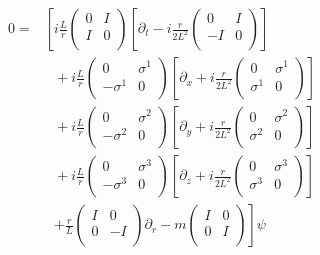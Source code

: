 \begin{align}
   0 =& \left[ i\frac{L}{r} \begin{pmatrix} 0 & I \\ I & 0 \\ \end{pmatrix} \left[ \partial_t - i\frac{r}{2L^2}\begin{pmatrix} 0 & I \\ -I & 0 \\ \end{pmatrix} \right] \right.\nonumber\\
      & ~~~ + i\frac{L}{r}\begin{pmatrix} 0 & \sigma^1 \\ -\sigma^1 & 0 \\ \end{pmatrix} \left[ \partial_x + i\frac{r}{2L^2}\begin{pmatrix} 0 & \sigma^1 \\ \sigma^1 & 0 \\ \end{pmatrix} \right] \nonumber\\
      & ~~~ + i\frac{L}{r}\begin{pmatrix} 0 & \sigma^2 \\ -\sigma^2 & 0 \\ \end{pmatrix} \left[ \partial_y + i\frac{r}{2L^2}\begin{pmatrix} 0 & \sigma^2 \\ \sigma^2 & 0 \\ \end{pmatrix} \right] \nonumber\\
      & ~~~ + i\frac{L}{r}\begin{pmatrix} 0 & \sigma^3 \\ -\sigma^3 & 0 \\ \end{pmatrix} \left[ \partial_z + i\frac{r}{2L^2}\begin{pmatrix} 0 & \sigma^3 \\ \sigma^3 & 0 \\ \end{pmatrix} \right] \nonumber\\
      & ~~~ \left. + \frac{r}{L}\begin{pmatrix} I & 0 \\ 0 & -I \\ \end{pmatrix} \partial_r - m \begin{pmatrix} I & 0 \\ 0 & I \\ \end{pmatrix} \right] \psi
\end{align}

